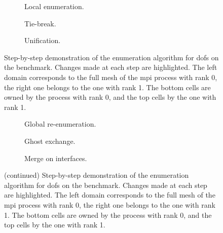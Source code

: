 {%
\let\oldthesubfigure\thesubfigure
\renewcommand{\thesubfigure}{Step \arabic{subfigure}}

\def\Length{1}
\def\Radius{0.03}

\begin{figure}
\centering
\begin{subfigure}{\textwidth}
  \resizebox{\textwidth}{!}{
    
    \hfill{}
    
  }
  \caption{Local enumeration.}
\end{subfigure}
\begin{subfigure}{\textwidth}
  \resizebox{\textwidth}{!}{
    
    \hfill{}
    
  }
  \caption{Tie-break.}
\end{subfigure}
\begin{subfigure}{\textwidth}
  \resizebox{\textwidth}{!}{
    
    \hfill{}
    
  }
  \caption{Unification.}
\end{subfigure}
\caption[Step-by-step demonstration of the enumeration algorithm for  on the benchmark.]{Step-by-step demonstration of the enumeration algorithm for \glspl{dof} on the benchmark. Changes made at each step are highlighted. The left domain corresponds to the full mesh of the \gls{mpi} process with rank 0, the right one belongs to the one with rank 1. The bottom cells are owned by the process with rank 0, and the top cells by the one with rank 1.}
\label{fig:enumdemosteps}
\end{figure}

\begin{figure}
\ContinuedFloat
\begin{subfigure}{\textwidth}
  \resizebox{\textwidth}{!}{
    
    \hfill{}
    
  }
  \caption{Global re-enumeration.}
\end{subfigure}
\begin{subfigure}{\textwidth}
  \resizebox{\textwidth}{!}{
    
    \hfill{}
    
  }
  \caption{Ghost exchange.}
\end{subfigure}
\begin{subfigure}{\textwidth}
  \resizebox{\textwidth}{!}{
    
    \hfill{}
    
  }
  \caption{Merge on interfaces.}
\end{subfigure}
\caption[]{\textup{(continued)} Step-by-step demonstration of the enumeration algorithm for \glspl{dof} on the benchmark. Changes made at each step are highlighted. The left domain corresponds to the full mesh of the \gls{mpi} process with rank 0, the right one belongs to the one with rank 1. The bottom cells are owned by the process with rank 0, and the top cells by the one with rank 1.}
\end{figure}

\renewcommand{\thesubfigure}{\oldthesubfigure}
}
